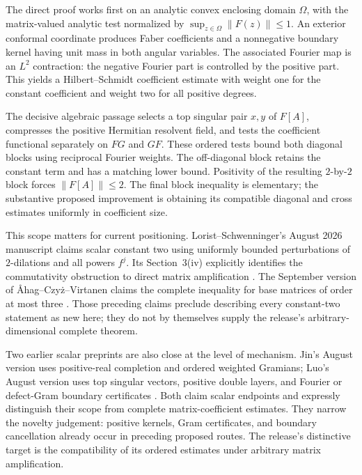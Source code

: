 The direct proof works first on an analytic convex enclosing domain
\(\Omega\), with the matrix-valued analytic test normalized by
\(\sup_{z\in\Omega}\|F(z)\|\le1\).
An exterior conformal coordinate produces Faber coefficients and a
nonnegative boundary kernel having unit mass in both angular variables.
The associated Fourier map is an \(L^2\) contraction: the negative
Fourier part is controlled by the positive part. This yields a
Hilbert--Schmidt coefficient estimate with weight one for the constant
coefficient and weight two for all positive degrees.

The decisive algebraic passage selects a top singular pair \(x,y\)
of \(F[A]\), compresses the positive Hermitian resolvent field, and tests
the coefficient functional separately on \(FG\) and \(GF\).
These ordered tests bound both diagonal blocks using reciprocal Fourier
weights. The off-diagonal block retains the constant term and has a
matching lower bound. Positivity of the resulting \(2\)-by-\(2\) block
forces \(\|F[A]\|\le2\). The final block inequality is elementary;
the substantive proposed improvement is obtaining its compatible
diagonal and cross estimates uniformly in coefficient size.

This scope matters for current positioning. Lorist--Schwenninger's
August 2026 manuscript claims scalar constant two using uniformly
bounded perturbations of \(2\)-dilations and all powers \(f^j\).
Its Section~3(iv) explicitly identifies the commutativity obstruction
to direct matrix amplification
\cite{GOLoristSchwenninger2026}. The September version of
\AA hag--Czy\.z--Virtanen claims the complete inequality for base
matrices of order at most three
\cite{GOAhagCzyzVirtanen2026}. Those preceding claims preclude
describing every constant-two statement as new here; they do not by
themselves supply the release's arbitrary-dimensional complete theorem.

Two earlier scalar preprints are also close at the level of mechanism.
Jin's August version uses positive-real completion and ordered weighted
Gramians; Luo's August version uses top singular vectors, positive double
layers, and Fourier or defect-Gram boundary certificates
\cite{GOJin2026,GOLuo2026}. Both claim scalar endpoints and expressly
distinguish their scope from complete matrix-coefficient estimates.
They narrow the novelty judgement: positive kernels, Gram certificates,
and boundary cancellation already occur in preceding proposed routes.
The release's distinctive target is the compatibility of its ordered
estimates under arbitrary matrix amplification.

